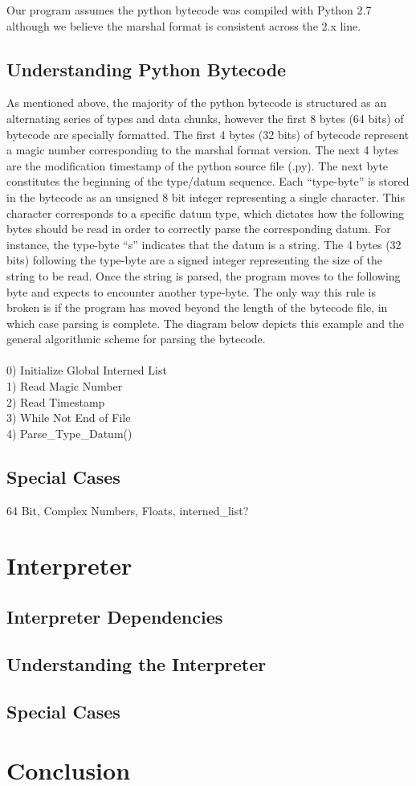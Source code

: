 \documentclass{article}
\begin{document}
Our program assumes the python bytecode was compiled with Python 2.7 although we believe the marshal format is consistent across the 2.x line.

\subsection{Understanding Python Bytecode}

As mentioned above, the majority of the python bytecode is structured as an alternating series of types and data chunks, however the first 8 bytes (64 bits) of bytecode are specially formatted.  The first 4 bytes (32 bits) of bytecode represent a magic number corresponding to the marshal format version.  The next 4 bytes are the modification timestamp of the python source file (.py).  The next byte constitutes the beginning of the type/datum sequence.  Each ``type-byte'' is stored in the bytecode as an unsigned 8 bit integer representing a single character.  This character corresponds to a specific datum type, which dictates how the following bytes should be read in order to correctly parse the corresponding datum.  For instance, the type-byte ``s'' indicates that the datum is a string.  The 4 bytes (32 bits) following the type-byte are a signed integer representing the size of the string to be read.  Once the string is parsed, the program moves to the following byte and expects to encounter another type-byte.  The only way this rule is broken is if the program has moved beyond the length of the bytecode file, in which case parsing is complete.  The diagram below depicts this example and the general algorithmic scheme for parsing the bytecode.\\
\\
0) Initialize Global Interned List \\
1) Read Magic Number \\
2) Read Timestamp \\
3) While Not End of File \\
4) \indent Parse\_Type\_Datum() \\

\subsection{Special Cases}

64 Bit, Complex Numbers, Floats, interned\_list?

\section{Interpreter}

\subsection{Interpreter Dependencies}

\subsection{Understanding the Interpreter}

\subsection{Special Cases}

\section{Conclusion}
\end{document}
